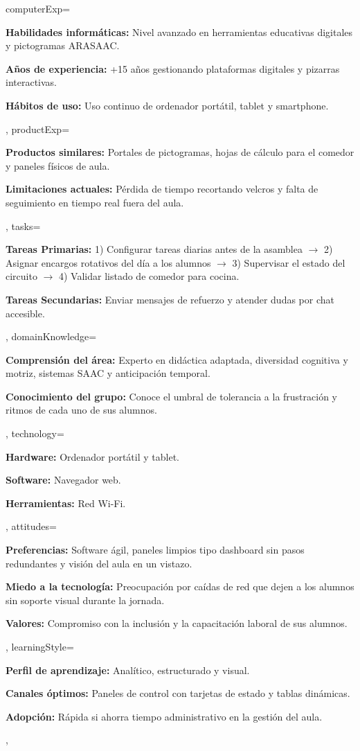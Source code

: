 \documentclass[10pt]{article}
\begin{document}
    computerExp={%
        \item \textbf{Habilidades informáticas:} Nivel avanzado en herramientas educativas digitales y pictogramas ARASAAC.
        \item \textbf{Años de experiencia:} +15 años gestionando plataformas digitales y pizarras interactivas.
        \item \textbf{Hábitos de uso:} Uso continuo de ordenador portátil, tablet y smartphone.
    },
    productExp={%
        \item \textbf{Productos similares:} Portales de pictogramas, hojas de cálculo para el comedor y paneles físicos de aula.
        \item \textbf{Limitaciones actuales:} Pérdida de tiempo recortando velcros y falta de seguimiento en tiempo real fuera del aula.
    },
    tasks={%
        \item \textbf{Tareas Primarias:} 
        1) Configurar tareas diarias antes de la asamblea $\rightarrow$ 2) Asignar encargos rotativos del día a los alumnos $\rightarrow$ 3) Supervisar el estado del circuito $\rightarrow$ 4) Validar listado de comedor para cocina.
        \item \textbf{Tareas Secundarias:} Enviar mensajes de refuerzo y atender dudas por chat accesible.
    },
    domainKnowledge={%
        \item \textbf{Comprensión del área:} Experto en didáctica adaptada, diversidad cognitiva y motriz, sistemas SAAC y anticipación temporal.
        \item \textbf{Conocimiento del grupo:} Conoce el umbral de tolerancia a la frustración y ritmos de cada uno de sus alumnos.
    },
    technology={%
        \item \textbf{Hardware:} Ordenador portátil y tablet.
        \item \textbf{Software:} Navegador web.
        \item \textbf{Herramientas:} Red Wi-Fi.
    },
    attitudes={%
        \item \textbf{Preferencias:} Software ágil, paneles limpios tipo dashboard sin pasos redundantes y visión del aula en un vistazo.
        \item \textbf{Miedo a la tecnología:} Preocupación por caídas de red que dejen a los alumnos sin soporte visual durante la jornada.
        \item \textbf{Valores:} Compromiso con la inclusión y la capacitación laboral de sus alumnos.
    },
    learningStyle={%
        \item \textbf{Perfil de aprendizaje:} Analítico, estructurado y visual.
        \item \textbf{Canales óptimos:} Paneles de control con tarjetas de estado y tablas dinámicas.
        \item \textbf{Adopción:} Rápida si ahorra tiempo administrativo en la gestión del aula.
    },
\end{document}
